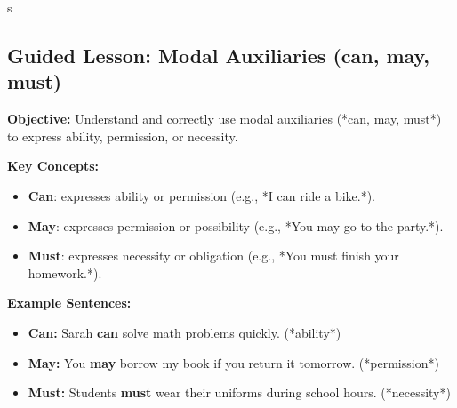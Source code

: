s\documentclass[12pt]{article}
\title{}
\date{}
\begin{document}
\subsection*{Guided Lesson: Modal Auxiliaries (can, may, must)}
\onehalfspacing

\begin{tcolorbox}[colframe=black!40, colback=gray!5, 
coltitle=black, colbacktitle=black!20, fonttitle=\bfseries\Large, 
title=Learning Objective, halign title=center, left=5pt, right=5pt, top=5pt, bottom=15pt]
\textbf{Objective:} Understand and correctly use modal auxiliaries (*can, may, must*) to express ability, permission, or necessity.
\end{tcolorbox}

\vspace{1em}

\begin{tcolorbox}[colframe=black!60, colback=white, 
coltitle=black, colbacktitle=black!15, fonttitle=\bfseries\Large, 
title=Key Concepts and Vocabulary, halign title=center, left=10pt, right=10pt, top=10pt, bottom=15pt]
\textbf{Key Concepts:}
\begin{itemize}
    \item \textbf{Can}: expresses ability or permission (e.g., *I can ride a bike.*).
    \item \textbf{May}: expresses permission or possibility (e.g., *You may go to the party.*).
    \item \textbf{Must}: expresses necessity or obligation (e.g., *You must finish your homework.*).
\end{itemize}
\end{tcolorbox}

\vspace{1em}

\begin{tcolorbox}[colframe=black!60, colback=white, 
coltitle=black, colbacktitle=black!15, fonttitle=\bfseries\Large, 
title=Examples, halign title=center, left=10pt, right=10pt, top=10pt, bottom=15pt]

\textbf{Example Sentences:}
\begin{itemize}
    \item \textbf{Can:} Sarah \textbf{can} solve math problems quickly. (*ability*)
    \item \textbf{May:} You \textbf{may} borrow my book if you return it tomorrow. (*permission*)
    \item \textbf{Must:} Students \textbf{must} wear their uniforms during school hours. (*necessity*)
\end{itemize}
\end{tcolorbox}
\end{document}
